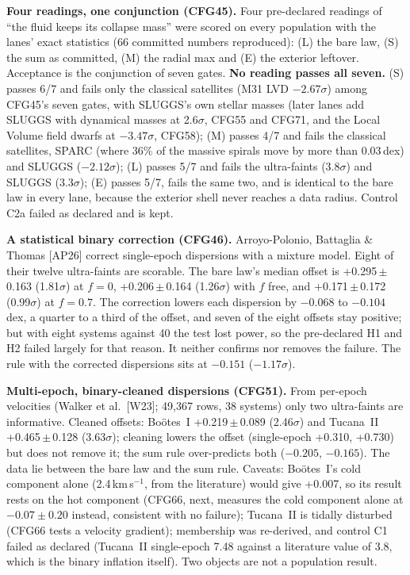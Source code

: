 \documentclass[10pt]{article}
\begin{document}
\textbf{Four readings, one conjunction (CFG45).} Four pre-declared readings of ``the fluid keeps its collapse mass'' were scored on every population with the lanes' exact statistics (66 committed numbers reproduced): (L) the bare law, (S) the sum as committed, (M) the radial max and (E) the exterior leftover. Acceptance is the conjunction of seven gates. \textbf{No reading passes all seven.} (S) passes 6/7 and fails only the classical satellites (M31 LVD $-2.67\sigma$) among CFG45's seven gates, with SLUGGS's own stellar masses (later lanes add SLUGGS with dynamical masses at 2.6$\sigma$, CFG55 and CFG71, and the Local Volume field dwarfs at $-3.47\sigma$, CFG58); (M) passes 4/7 and fails the classical satellites, SPARC (where 36\% of the massive spirals move by more than 0.03\,dex) and SLUGGS ($-2.12\sigma$); (L) passes 5/7 and fails the ultra-faints (3.8$\sigma$) and SLUGGS (3.3$\sigma$); (E) passes 5/7, fails the same two, and is identical to the bare law in every lane, because the exterior shell never reaches a data radius. Control C2a failed as declared and is kept.

\textbf{A statistical binary correction (CFG46).} Arroyo-Polonio, Battaglia \& Thomas [AP26] correct single-epoch dispersions with a mixture model. Eight of their twelve ultra-faints are scorable. The bare law's median offset is +0.295\,$\pm$\,0.163 (1.81$\sigma$) at $f=0$, +0.206\,$\pm$\,0.164 (1.26$\sigma$) with $f$ free, and +0.171\,$\pm$\,0.172 (0.99$\sigma$) at $f=0.7$. The correction lowers each dispersion by $-0.068$ to $-0.104$\,dex, a quarter to a third of the offset, and seven of the eight offsets stay positive; but with eight systems against 40 the test lost power, so the pre-declared H1 and H2 failed largely for that reason. It neither confirms nor removes the failure. The rule with the corrected dispersions sits at $-0.151$ ($-1.17\sigma$).

\textbf{Multi-epoch, binary-cleaned dispersions (CFG51).} From per-epoch velocities (Walker et al.\ [W23]; 49,367 rows, 38 systems) only two ultra-faints are informative. Cleaned offsets: Bo\"otes~I +0.219\,$\pm$\,0.089 (2.46$\sigma$) and Tucana~II +0.465\,$\pm$\,0.128 (3.63$\sigma$); cleaning lowers the offset (single-epoch +0.310, +0.730) but does not remove it; the sum rule over-predicts both ($-0.205$, $-0.165$). The data lie between the bare law and the sum rule. Caveats: Bo\"otes~I's cold component alone (2.4\,km\,s$^{-1}$, from the literature) would give +0.007, so its result rests on the hot component (CFG66, next, measures the cold component alone at $-0.07\pm0.20$ instead, consistent with no failure); Tucana~II is tidally disturbed (CFG66 tests a velocity gradient); membership was re-derived, and control C1 failed as declared (Tucana~II single-epoch 7.48 against a literature value of 3.8, which is the binary inflation itself). Two objects are not a population result.
\end{document}
